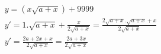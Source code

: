 \begin{ex}
\begin{align}
&y=(x\sqrt{a+x})+9999\nonumber\\
&y'=1.\sqrt{a+x}+\frac{x}{2\sqrt{a+x}}=\frac{2\sqrt{a+x}.\sqrt{a+x}+x}{2\sqrt{a+x}}\nonumber\\
&y'=\frac{2a+2x+x}{2\sqrt{a+x}}=\frac{2a+3x}{2\sqrt{a+x}}\nonumber
\end{align}
\end{ex}